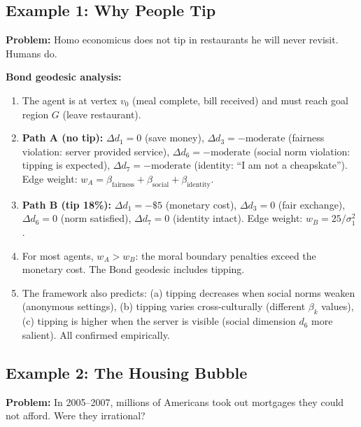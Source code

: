 \documentclass[12pt]{article}
\theoremstyle{definition}
\theoremstyle{remark}
\begin{document}
\subsection{Example 1: Why People Tip}

\textbf{Problem:} Homo economicus does not tip in restaurants he will never revisit.  Humans do.

\textbf{Bond geodesic analysis:}
\begin{enumerate}
    \item The agent is at vertex $v_0$ (meal complete, bill received) and must reach goal region $G$ (leave restaurant).
    \item \textbf{Path A (no tip):} $\Delta d_1 = 0$ (save money), $\Delta d_3 = -\text{moderate}$ (fairness violation: server provided service), $\Delta d_6 = -\text{moderate}$ (social norm violation: tipping is expected), $\Delta d_7 = -\text{moderate}$ (identity: ``I am not a cheapskate'').  Edge weight: $w_A = \beta_{\text{fairness}} + \beta_{\text{social}} + \beta_{\text{identity}}$.
    \item \textbf{Path B (tip 18\%):} $\Delta d_1 = -\$5$ (monetary cost), $\Delta d_3 = 0$ (fair exchange), $\Delta d_6 = 0$ (norm satisfied), $\Delta d_7 = 0$ (identity intact).  Edge weight: $w_B = 25/\sigma_1^2$.
    \item For most agents, $w_A > w_B$: the moral boundary penalties exceed the monetary cost.  The Bond geodesic includes tipping.
    \item The framework also predicts: (a) tipping decreases when social norms weaken (anonymous settings), (b) tipping varies cross-culturally (different $\beta_k$ values), (c) tipping is higher when the server is visible (social dimension $d_6$ more salient).  All confirmed empirically.
\end{enumerate}

\subsection{Example 2: The Housing Bubble}

\textbf{Problem:} In 2005--2007, millions of Americans took out mortgages they could not afford.  Were they irrational?
\end{document}
